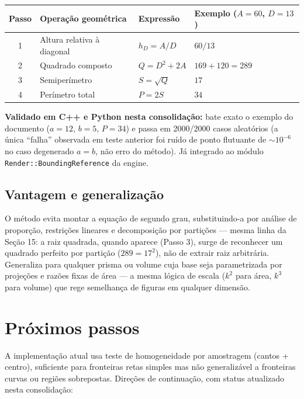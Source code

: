 \documentclass[11pt,a4paper]{article}
\begin{document}
\begin{table}[h]
\centering
\begin{tabular}{clll}
\toprule
Passo & Operação geométrica & Expressão & Exemplo ($A=60$, $D=13$) \\
\midrule
1 & Altura relativa à diagonal & $h_D = A/D$    & $60/13$ \\
2 & Quadrado composto          & $Q = D^2+2A$   & $169+120=289$ \\
3 & Semiperímetro               & $S=\sqrt{Q}$   & $17$ \\
4 & Perímetro total             & $P=2S$         & $34$ \\
\bottomrule
\end{tabular}
\end{table}

\textbf{Validado em C++ e Python nesta consolidação:} bate exato o exemplo do documento ($a=12$, $b=5$, $P=34$) e passa em 2000/2000 casos aleatórios (a única ``falha'' observada em teste anterior foi ruído de ponto flutuante de $\sim 10^{-6}$ no caso degenerado $a=b$, não erro do método). Já integrado ao módulo \texttt{Render::BoundingReference} da engine.

\subsection{Vantagem e generalização}

O método evita montar a equação de segundo grau, substituindo-a por análise de proporção, restrições lineares e decomposição por partições --- mesma linha da Seção 15: a raiz quadrada, quando aparece (Passo 3), surge de reconhecer um quadrado perfeito por partição ($289=17^2$), não de extrair raiz arbitrária. Generaliza para qualquer prisma ou volume cuja base seja parametrizada por projeções e razões fixas de área --- a mesma lógica de escala ($k^2$ para área, $k^3$ para volume) que rege semelhança de figuras em qualquer dimensão.

\bigskip
\noindent\hrulefill

\section{Próximos passos}

A implementação atual usa teste de homogeneidade por amostragem (cantos + centro), suficiente para fronteiras retas simples mas não generalizável a fronteiras curvas ou regiões sobrepostas. Direções de continuação, com status atualizado nesta consolidação:
\end{document}
